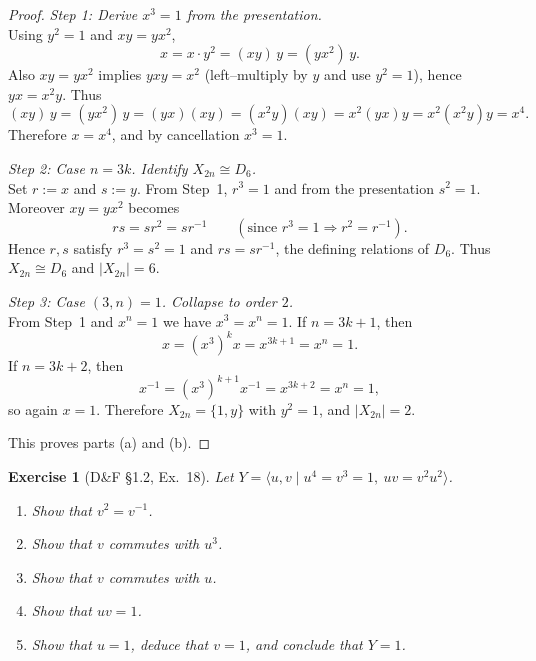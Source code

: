 \documentclass[12pt]{article}
\newtheorem{exercise}[theorem]{Exercise}
\theoremstyle{definition}
\begin{document}
\begin{proof}
\noindent\emph{Step 1: Derive $x^{3}=1$ from the presentation.}\\

\noindent
Using $y^{2}=1$ and $xy=yx^{2}$,
\[
x=x\cdot y^{2}=(xy)\,y=(yx^{2})\,y.
\]
Also $xy=yx^{2}$ implies $yxy=x^{2}$ (left–multiply by $y$ and use $y^{2}=1$), hence $yx=x^{2}y$.
Thus
\[
(xy)\,y=(y x^{2})\,y=(y x)(x y)=(x^{2}y)(x y)=x^{2}(y x)y=x^{2}(x^{2}y)y=x^{4}.
\]
Therefore $x=x^{4}$, and by cancellation $x^{3}=1$.

\dotfill

\noindent\emph{Step 2: Case $n=3k$. Identify $X_{2n}\cong D_{6}$.}\\

\noindent
Set $r:=x$ and $s:=y$. From Step~1, $r^{3}=1$ and from the presentation $s^{2}=1$.
Moreover $xy=yx^{2}$ becomes
\[
rs=sr^{2}=sr^{-1}\qquad(\text{since }r^{3}=1\Rightarrow r^{2}=r^{-1}).
\]
Hence $r,s$ satisfy $r^{3}=s^{2}=1$ and $rs=sr^{-1}$, the defining relations of $D_{6}$.
Thus $X_{2n}\cong D_{6}$ and $|X_{2n}|=6$.

\dotfill

\noindent\emph{Step 3: Case $(3,n)=1$. Collapse to order $2$.}\\

\noindent
From Step~1 and $x^{n}=1$ we have $x^{3}=x^{n}=1$. If $n=3k+1$, then
\[
x=(x^{3})^{k}x=x^{3k+1}=x^{n}=1.
\]
If $n=3k+2$, then
\[
x^{-1}=(x^{3})^{k+1}x^{-1}=x^{3k+2}=x^{n}=1,
\]
so again $x=1$. Therefore $X_{2n}=\{1,y\}$ with $y^{2}=1$, and $|X_{2n}|=2$.

\dotfill

This proves parts (a) and (b).
\end{proof}

\newpage

\begin{exercise}[D\&F §1.2, Ex.~18]
Let $Y=\langle u,v \mid u^{4}=v^{3}=1,\ uv=v^{2}u^{2}\rangle$.
\begin{enumerate}
\item[(a)] Show that $v^{2}=v^{-1}$.
\item[(b)] Show that $v$ commutes with $u^{3}$.
\item[(c)] Show that $v$ commutes with $u$.
\item[(d)] Show that $uv=1$.
\item[(e)] Show that $u=1$, deduce that $v=1$, and conclude that $Y=1$.
\end{enumerate}
\end{exercise}
\end{document}
